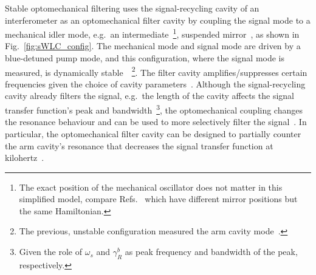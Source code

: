 Stable optomechanical filtering uses the signal-recycling cavity of an interferometer as an optomechanical filter cavity by coupling the signal mode to a mechanical idler mode, e.g.\ an intermediate~\footnote{The exact position of the mechanical oscillator does not matter in this simplified model, compare Refs.~\cite{liBroadbandSensitivityImprovement2020,liEnhancingInterferometerSensitivity2021} which have different mirror positions but the same Hamiltonian.}, suspended mirror~\cite{}, as shown in Fig.~\ref{fig:sWLC_config}. The mechanical mode and signal mode are driven by a blue-detuned pump mode, and this configuration, where the signal mode is measured, is dynamically stable~\cite{}~\footnote{The previous, unstable configuration measured the arm cavity mode~\cite{miaoEnhancingBandwidthGravitationalWave2015}.}.
The filter cavity amplifies/suppresses certain frequencies given the choice of cavity parameters~\cite{}. Although the signal-recycling cavity already filters the signal, e.g.\ the length of the cavity affects the signal transfer function's peak and bandwidth~\footnote{Given the role of $\omega_s$ and $\gamma^b_R$ as peak frequency and bandwidth of the peak, respectively.}, the optomechanical coupling changes the resonance behaviour and can be used to more selectively filter the signal~\cite{}. %
In particular, the optomechanical filter cavity can be designed to partially counter the arm cavity's resonance that decreases the signal transfer function at kilohertz~\cite{}. %
